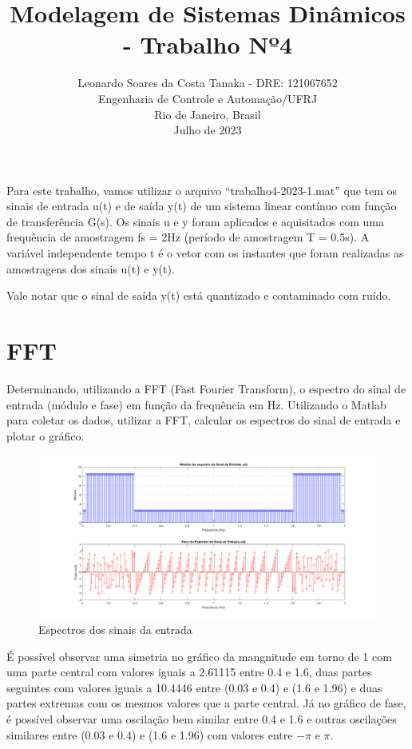 \documentclass[10pt]{article}
\title{Modelagem de Sistemas Dinâmicos - Trabalho Nº4}
\author{
    Leonardo Soares da Costa Tanaka - DRE: 121067652 \\
    Engenharia de Controle e Automação/UFRJ \\
    Rio de Janeiro, Brasil \\
    Julho de 2023
}
\date{}
\begin{document}
\maketitle
\thispagestyle{capa}

\quad Para este trabalho, vamos utilizar o arquivo “trabalho4-2023-1.mat” que tem os sinais de entrada u(t) e de saída y(t) de um sistema
linear contínuo com função de transferência G(s). Os sinais u e y foram aplicados e aquisitados
com uma frequência de amostragem fs = 2Hz (período de amostragem T = 0.5s). A variável
independente tempo t é o vetor com os instantes que foram realizadas as amostragens dos
sinais u(t) e y(t).

\quad Vale notar que o sinal de saída y(t) está quantizado e contaminado com ruído.

\section{FFT}

\quad Determinando, utilizando a FFT (Fast Fourier Transform), o espectro do sinal de entrada
(módulo e fase) em função da frequência em Hz. Utilizando o Matlab para coletar os dados,
utilizar a FFT, calcular os espectros do sinal de entrada e plotar o gráfico.

\begin{figure}[h]
    \centering
    \includegraphics[scale=0.34]{fft.png}
    \caption{Espectros dos sinais da entrada}
\end{figure}

\quad É possível observar uma simetria no gráfico da mangnitude em torno de 1
com uma parte central com valores iguais a 2.61115 entre 0.4 e 1.6,
duas partes seguintes com valores iguais a 10.4446 entre (0.03 e 0.4) e (1.6 e 1.96) e duas
partes extremas com os mesmos valores que a parte central. Já no gráfico de fase, é possível
observar uma oscilação bem similar entre 0.4 e 1.6 e
outras oscilações similares entre (0.03 e 0.4) e (1.6 e 1.96) com valores entre $-\pi$ e $\pi$.
\end{document}
